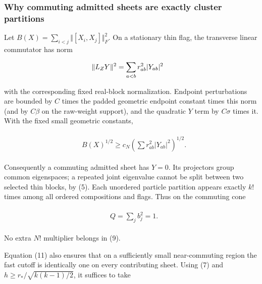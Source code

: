 \subsubsection{Why commuting admitted sheets are exactly cluster
partitions}\label{j-why-commuting-admitted-sheets-are-exactly-cluster-partitions}

Let \(B(X)=\sum _{i<j}\Vert [X_{i},X_{j}]\Vert _{F}^{2}\). On a
stationary thin flag, the transverse linear commutator has norm

\begin{gather*}
\begin{aligned}
& \Vert L_{Z} Y\Vert ^{2}=\sum _{a<b} r_{ab}^{2} \vert Y_{ab}\vert ^{2}
\end{aligned}\notag
\end{gather*}

with the corresponding fixed real-block normalization. Endpoint
perturbations are bounded by \(C\) times the padded geometric endpoint
constant times this norm (and by \(C \beta\) on the raw-weight support),
and the quadratic \(Y\) term by \(C \sigma\) times it. With the fixed
small geometric constants,

\begin{gather*}
\begin{aligned}
& B(X)^{1/2} \ge  c_{N} (\sum  r_{ab}^{2}\vert Y_{ab}\vert ^{2})^{1/2}.
\end{aligned}\tag{11}
\end{gather*}

Consequently a commuting admitted sheet has \(Y=0\). Its projectors
group common eigenspaces; a repeated joint eigenvalue cannot be split
between two selected thin blocks, by (5). Each unordered particle
partition appears exactly \(k\)! times among all ordered compositions
and flags. Thus on the commuting cone

\begin{gather*}
\begin{aligned}
& Q=\sum _{j} b_{j}^{2}=1.
\end{aligned}\tag{12}
\end{gather*}

No extra \(N\)! multiplier belongs in (9).

Equation (11) also ensures that on a sufficiently small near-commuting
region the fast cutoff is identically one on every contributing sheet.
Using (7) and \(h\ge r_{*}/\sqrt{k(k-1)/2}\), it suffices to take

